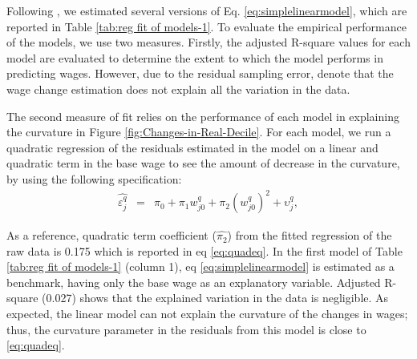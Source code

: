 \begin{onehalfspace}
Following \citet{2011Firpo}, we estimated several versions of Eq.
\ref{eq:simplelinearmodel}, which are reported in Table \ref{tab:reg fit of models-1}.
To evaluate the empirical performance of the models, we use two measures.
Firstly, the adjusted R-square values for each model are evaluated
to determine the extent to which the model performs in predicting
wages. However, due to the residual sampling error, \citet{2011Firpo}
denote that the wage change estimation does not explain all the variation
in the data.

The second measure of fit relies on the performance of each model
in explaining the curvature in Figure \ref{fig:Changes-in-Real-Decile}.
For each model, we run a quadratic regression of the residuals estimated
in the model on a linear and quadratic term in the base wage to see
the amount of decrease in the curvature, by using the following specification:
\begin{eqnarray}
\hat{\varepsilon_{j}^{q}} & = & \pi_{0}+\pi_{1}w_{j0}^{q}+\pi_{2}(w_{j0}^{q})^{2}+\upsilon_{j}^{q},\label{eq:quadratic}
\end{eqnarray}

As a reference, quadratic term coefficient ($\hat{\pi_{2}}$) from
the fitted regression of the raw data is 0.175 which is reported in
eq \ref{eq:quadeq}. In the first model of Table \ref{tab:reg fit of models-1}
(column 1), eq \ref{eq:simplelinearmodel} is estimated as a benchmark,
having only the base wage as an explanatory variable. Adjusted R-square
(0.027) shows that the explained variation in the data is negligible.
As expected, the linear model can not explain the curvature of the
changes in wages; thus, the curvature parameter in the residuals from
this model is close to \ref{eq:quadeq}.
\end{onehalfspace}
\begin{center}

\par\end{center}

\vspace{-1cm}

